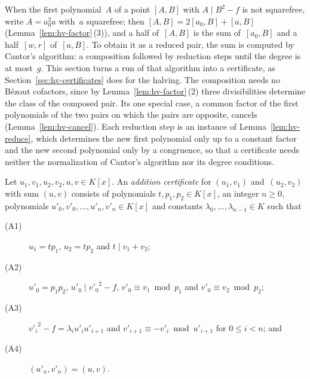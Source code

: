 When the first polynomial~$A$ of a point $[A, B]$ with $A \mid B^2 - f$ is not squarefree, write
$A = a_0^2 a$ with~$a$ squarefree; then $[A, B] = 2[a_0, B] + [a, B]$
(Lemma~\ref{lem:hv-factor}\,(3)), and a half of~$[A, B]$ is the sum of~$[a_0, B]$ and a
half~$[w, r]$ of~$[a, B]$. To obtain it as a reduced pair, the sum is computed by Cantor's
algorithm: a composition followed by reduction steps until the degree is at most~$g$. This section
turns a run of that algorithm into a certificate, as Section~\ref{sec:hv-certificates} does for
the halving. The composition needs no B\'ezout cofactors, since by Lemma~\ref{lem:hv-factor}\,(2)
three divisibilities determine the class of the composed pair. Its one special case, a common
factor of the first polynomials of the two pairs on which the pairs are opposite, cancels
(Lemma~\ref{lem:hv-cancel}). Each reduction step is an instance of Lemma~\ref{lem:hv-reduce},
which determines the new first polynomial only up to a constant factor and the new second
polynomial only by a congruence, so that a certificate needs neither the normalization of
Cantor's algorithm nor its degree conditions.

\begin{definition}
\label{def:hv-add-cert}
\leanok
Let $u_1, v_1, u_2, v_2, u, v \in K[x]$. An \emph{addition certificate} for $(u_1, v_1)$
and~$(u_2, v_2)$ with sum $(u, v)$ consists of polynomials $t, p_1, p_2 \in K[x]$, an integer
$n \ge 0$, polynomials $u'_0, v'_0, \dots, u'_n, v'_n \in K[x]$ and constants
$\lambda_0, \dots, \lambda_{n-1} \in K$ such that
\begin{description}
  \item[\textmd{(A1)}] $u_1 = t p_1$, $u_2 = t p_2$ and $t \mid v_1 + v_2$;
  \item[\textmd{(A2)}] $u'_0 = p_1 p_2$, $u'_0 \mid {v'_0}^2 - f$, $v'_0 \equiv v_1 \bmod p_1$
    and $v'_0 \equiv v_2 \bmod p_2$;
  \item[\textmd{(A3)}] ${v'_i}^2 - f = \lambda_i u'_i u'_{i+1}$ and
    $v'_{i+1} \equiv -v'_i \bmod u'_{i+1}$ for $0 \le i < n$; and
  \item[\textmd{(A4)}] $(u'_n, v'_n) = (u, v)$.
\end{description}
\end{definition}


